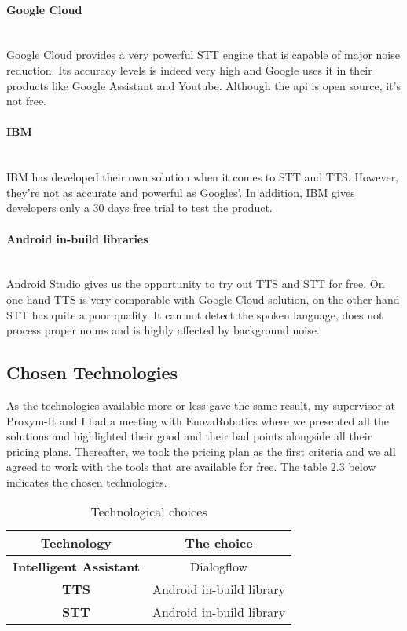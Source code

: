 \paragraph{Google Cloud}~\\
Google Cloud provides a very powerful STT engine that is capable of major noise reduction. Its accuracy levels is indeed very high and Google uses it in their products like Google Assistant and Youtube. Although the api is open source, it's not free\cite{12}. 

\paragraph{IBM}~\\
IBM has developed their own solution when it comes to STT and TTS. However, they're not as accurate and powerful as Googles'. In addition, IBM gives developers only a 30 days free trial to test the product.

\paragraph{Android in-build libraries}~\\
Android Studio gives us the opportunity to try out TTS and STT for free. On one hand TTS is very comparable with Google Cloud solution, on the other hand STT has quite a poor quality. It can not detect the spoken language, does not process proper nouns and is highly affected by background noise\cite{13}. 


\subsection{Chosen Technologies}
As the technologies available more or less gave the same result, my supervisor at Proxym-It and I had a meeting with EnovaRobotics where we presented all the solutions and highlighted their good and their bad points alongside all their pricing plans. Thereafter, we took the pricing plan as the first criteria and we all agreed to work with the tools that are available for free. The table 2.3 below indicates the chosen technologies.   
\begin{table}[hbt!]
\label{tab:technological choice}
\centering
\begin{tabular}{ |c|c|  }
 \hline
 Technology & The choice \\
 \hline
 \hline
    \textbf{Intelligent Assistant}& Dialogflow \\
 \hline
 \textbf{TTS}  & Android in-build library \\
  \hline
 \textbf{STT}  & Android in-build library \\
  \hline 
\end{tabular}
\caption{Technological choices}
\end{table}
